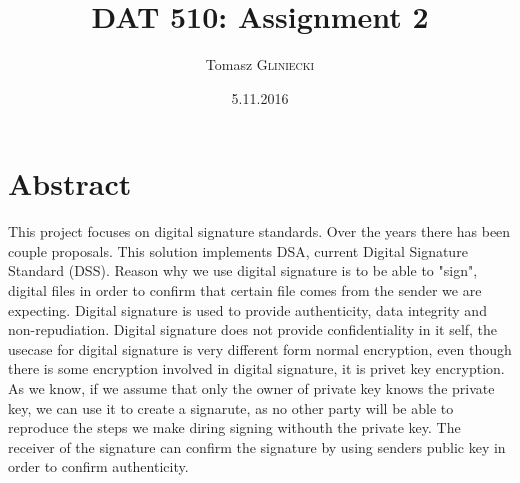 \documentclass[12pt]{report}
\title{DAT 510: Assignment 2} %
\author{Tomasz \textsc{Gliniecki}} %
\date{5.11.2016} %
\begin{document}
\maketitle %



\section*{Abstract}
This project focuses on digital signature standards. Over the years there has been couple proposals. This solution implements DSA, current Digital Signature Standard (DSS). Reason why we use digital signature is to be able to "sign", digital files in order to confirm that certain file comes from the sender we are expecting. Digital signature is used to provide authenticity, data integrity and non-repudiation. Digital signature does not provide confidentiality in it self, the usecase for digital signature is very different form normal encryption, even though there is some encryption involved in digital signature, it is privet key encryption. As we know, if we assume that only the owner of private key knows the private key, we can use it to create a signarute, as no other party will be able to reproduce the steps we make diring signing withouth the private key. The receiver of the signature can confirm the signature by using senders public key in order to confirm authenticity.
\end{document}
